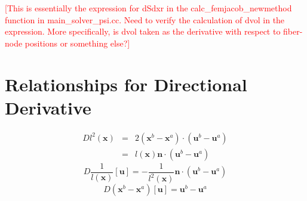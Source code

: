 \documentclass[12pt,aps,pre]{revtex4}
\newcommand{\red}[1]{\textcolor{red}{[#1]}}
\begin{document}
\red{This is essentially the expression for dSdxr in the calc\_femjacob\_newmethod function in main\_solver\_psi.cc. Need to verify the calculation of dvol in the expression. More specifically, is dvol taken as the derivative with respect to fiber-node positions or something else?}
\appendix
%
\section{Relationships for Directional Derivative}
\label{app:relationships}
\begin{eqnarray}
Dl^2(\textbf{x}) &=& 2 (\textbf{x}^b - \textbf{x}^a) \cdot (\textbf{u}^b - \textbf{u}^a) \nonumber\\
&=& l(\textbf{x})\textbf{n} \cdot (\textbf{u}^b - \textbf{u}^a) 
\label{Dl^2}
\end{eqnarray}
%
\begin{equation}
D\frac{1}{l(\textbf{x})}[\textbf{u}] = -\frac{1}{l^{2}(\textbf{x})}\textbf{n} \cdot (\textbf{u}^b - \textbf{u}^a)
\label{Dl^-1}
\end{equation}
%
\begin{equation}
D(\textbf{x}^b - \textbf{x}^a)[\textbf{u}] = \textbf{u}^b - \textbf{u}^a
\label{D(xb-xa)}
\end{equation}
%



\end{document}
